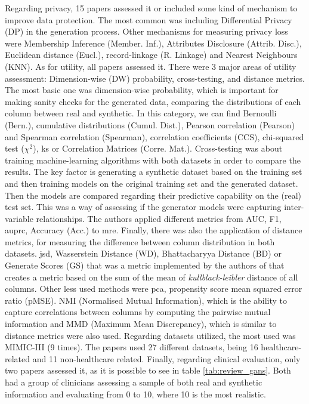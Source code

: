 Regarding privacy, 15 papers assessed it or included some kind of mechanism to improve data protection. The most common was including Differential Privacy (DP) in the generation process. Other mechanisms for measuring privacy loss were Membership Inference (Member. Inf.), Attributes Disclosure (Attrib. Disc.), Euclidean distance (Eucl.), record-linkage (R. Linkage) and Nearest Neighbours (KNN).
As for utility, all papers assessed it. There were 3 major areas of utility assessment: Dimension-wise (DW) probability, cross-testing, and distance metrics. The most basic one was dimension-wise probability, which is important for making sanity checks for the generated data, comparing the distributions of each column between real and synthetic. In this category, we can find Bernoulli (Bern.), cumulative distributions (Cumul. Dist.), Pearson correlation (Pearson) and Spearman correlation (Spearman), correlation coefficients (CCS), chi-squared test ($\chi^{2}$),  \ac{ks} or Correlation Matrices (Corre. Mat.).
Cross-testing was about training machine-learning algorithms with both datasets in order to compare the results. The key factor is generating a synthetic dataset based on the training set and then training models on the original training set and the generated dataset. Then the models are compared regarding their predictive capability on the (real) test set. This was a way of assessing if the generator models were capturing inter-variable relationships. The authors applied different metrics from AUC, F1, \ac{auprc}, Accuracy (Acc.) to \ac{mre}. Finally, there was also the application of distance metrics, for measuring the difference between column distribution in both datasets. \acl{jsd}, Wasserstein Distance (WD), Bhattacharyya Distance (BD) or Generate Scores (GS) that was a metric implemented by the authors of \cite{liu_ppgan_2019} that creates a metric based on the sum of the mean of \textit{kullblack-leibler}  distance of all columns. Other less used methods were \ac{pca}, propensity score mean squared error ratio (pMSE). NMI (Normalised Mutual Information), which is the ability to capture correlations between columns by computing the pairwise mutual information and MMD (Maximum Mean Discrepancy), which is similar to distance metrics were also used. Regarding datasets utilized, the most used was MIMIC-III \cite{mimiciii} (9 times). The papers used 27 different datasets, being 16 healthcare-related and 11 non-healthcare related. 
Finally, regarding clinical evaluation, only two papers assessed it, as it is possible to see in table \ref{tab:review_gans}. Both had a group of clinicians assessing a sample of both real and synthetic information and evaluating from 0 to 10, where 10 is the most realistic.
